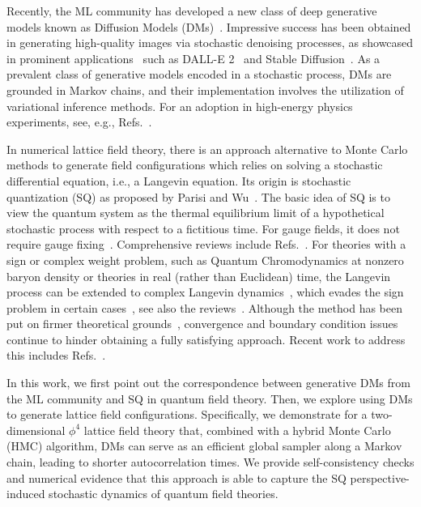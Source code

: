 Recently, the ML community has developed a new class of deep generative models known as Diffusion Models (DMs)~\cite{yang:2022diffusion}. Impressive success has been obtained in generating high-quality images via stochastic denoising processes, as showcased in prominent applications~\cite{Croitoru:2023dm} such as DALL-E 2~\cite{2022arXiv220406125R} and Stable Diffusion~\cite{Rombach_2022_CVPR}. As a prevalent class of generative models encoded in a stochastic process, DMs are grounded in Markov chains, and their implementation involves the utilization of variational inference methods. For an adoption in high-energy physics experiments, see, e.g., Refs.~\cite{Mikuni:2022xry,Mikuni:2023dvk}.


In numerical lattice field theory, there is an approach alternative to Monte Carlo methods to generate field configurations which relies on solving a stochastic differential equation, i.e., a Langevin equation. Its origin is stochastic quantization (SQ) as proposed by Parisi and Wu~\cite{Parisi:1980ys}. The basic idea of SQ is to view the quantum system as the thermal equilibrium limit of a hypothetical stochastic process with respect to a fictitious time. For gauge fields, it does not require gauge fixing~\cite{Parisi:1980ys}. Comprehensive reviews include Refs.~\cite{Damgaard:1987rr,Namiki:1993fd}.
For theories with a sign or complex weight problem, such as Quantum Chromodynamics at nonzero baryon density or theories in real (rather than Euclidean) time, the Langevin process can be extended to complex Langevin dynamics~\cite{Parisi:1983mgm}, which evades the sign problem in certain cases~\cite{Berges:2006xc,Aarts:2008rr,Aarts:2008wh,Seiler:2012wz,Sexty:2013ica}, see also the reviews~\cite{Aarts:2015tyj,Attanasio:2020spv,Berger:2019odf,Nagata:2021ugx}. Although the method has been put on firmer theoretical grounds~\cite{Aarts:2009uq,Aarts:2011ax,Nagata:2016vkn,Aarts:2017vrv,Scherzer:2018hid},
convergence and boundary condition issues continue to hinder obtaining a fully satisfying approach. Recent work to address this includes
Refs.~\cite{WesthHansen:2022iqd,Alvestad:2021hsi,Alvestad:2022abf,Lampl:2023xpb}.

In this work, we first point out the correspondence between generative DMs from the ML community and SQ in quantum field theory. Then, we explore using DMs to generate lattice field configurations. Specifically, we demonstrate for a two-dimensional $\phi^4$ lattice field theory that, combined with a hybrid Monte Carlo (HMC) algorithm, DMs can serve as an efficient global sampler along a Markov chain, leading to shorter autocorrelation times. We provide self-consistency checks and numerical evidence that this approach is %
able to capture the SQ perspective-induced stochastic dynamics of quantum field theories.

